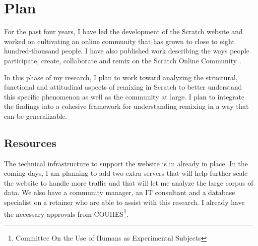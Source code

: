 \chapter{Plan}

For the past four years, I have led the development of the Scratch website and worked on cultivating an online community that has grown to close to eight hundred-thousand people.
I have also published work describing the ways people participate, create, collaborate and remix on the Scratch Online Community \citep{monroy-hernandez_scratchr:_2007, monroy-hernandez_empowering_2008, monroy-hernandez_computers_2011, hill_responses_2010, aragon_tale_2009, nickerson_appropriation_2011, brennan_making_2010}.

In this phase of my research, I plan to work toward analyzing the structural, functional and attitudinal aspects of remixing in Scratch to better understand this specific phenomenon as well as the community at large.
I plan to integrate the findings into a cohesive framework for understanding remixing in a way that can be generalizable.

\section{Resources}
The technical infrastructure to support the website is in already in place.
In the coming days, I am planning to add two extra servers that will help further scale the website to handle more traffic and that will let me analyze the large corpus of data.
We also have a community manager, an IT consultant and a database specialist on a retainer who are able to assist with this research.
I already have the necessary approvals from COUHES\footnote{Committee On the Use of Humans as Experimental Subjects}.

